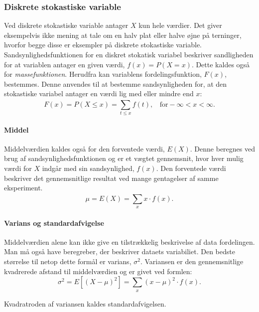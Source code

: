 \subsubsection{Diskrete stokastiske variable}
Ved diskrete stokastiske variable antager $X$ kun hele værdier. Det giver eksempelvis ikke mening at tale om en halv plat eller halve øjne på terninger, hvorfor begge disse er eksempler på diskrete stokastiske variable.
Sandsynlighedsfunktionen for en diskret stokatisk variabel beskriver sandligheden for at variablen antager en given værdi, $f(x)=P(X=x)$. Dette kaldes også for \emph{massefunktionen}.
Herudfra kan variablens fordelingsfunktion, $F(x)$, bestemmes. Denne anvendes til at bestemme sandsynligheden for, at den stokastiske variabel antager en værdi lig med eller mindre end $x$: $$F(x)=P(X \le x)=\sum_{t \le x}^{} f(t), \ \ \ \ \text{for}  -\infty < x < \infty.$$

\paragraph{Middel} Middelværdien kaldes også for den forventede værdi, $E(X)$. Denne beregnes ved brug af sandsynlighedsfunktionen og er et vægtet gennemsnit, hvor hver mulig værdi for $X$ indgår med sin sandsynlighed, $f(x)$. Den forventede værdi beskriver det gennemsnitlige resultat ved mange gentagelser af samme eksperiment.
$$\mu=E(X)=\sum_{x}^{}x \cdot f(x).$$

\paragraph{Varians og standardafvigelse} Middelværdien alene kan ikke give en tilstrækkelig beskrivelse af data fordelingen. Man må også have beregreber, der beskriver dataets variabiliet. Den bedste størrelse til netop dette formål er varians, $\sigma ^2$. Variansen er den gennemsnitlige kvadrerede afstand til middelværdien og er givet ved formlen:
$$\sigma ^2=E[(X-\mu)^2]=\sum_{x}^{}(x-\mu)^2 \cdot f(x).$$

\noindent Kvadratroden af variansen kaldes standardafvigelsen. 

